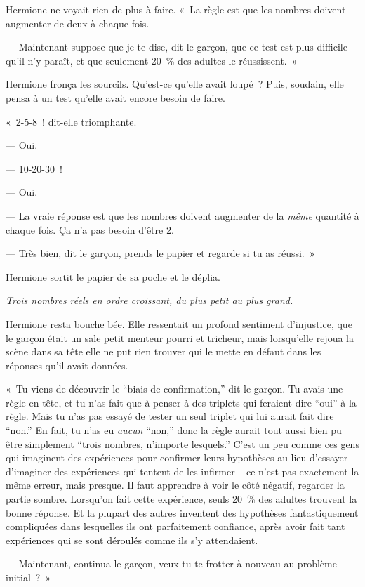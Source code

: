 Hermione ne voyait rien de plus à faire.
«~La règle est que les nombres doivent augmenter de deux à chaque fois.

--- Maintenant suppose que je te dise, dit le garçon, que ce test est plus difficile qu'il n'y paraît, et que seulement 20~\% des adultes le réussissent.~»

Hermione fronça les sourcils. Qu'est-ce qu'elle avait loupé~?
Puis, soudain, elle pensa à un test qu'elle avait encore besoin de faire.

«~2-5-8~! dit-elle triomphante.

--- Oui.

--- 10-20-30~!

--- Oui.

--- La vraie réponse est que les nombres doivent augmenter de la \emph{même} quantité à chaque fois. Ça n'a pas besoin d'être 2.

--- Très bien, dit le garçon, prends le papier et regarde si tu as réussi.~»

Hermione sortit le papier de sa poche et le déplia.

\emph{Trois nombres réels en ordre croissant, du plus petit au plus grand.}

Hermione resta bouche bée.
Elle ressentait un profond sentiment d'injustice, que le garçon était un sale petit menteur pourri et tricheur, mais lorsqu'elle rejoua la scène dans sa tête elle ne put rien trouver qui le mette en défaut dans les réponses qu'il avait données.

«~Tu viens de découvrir le “biais de confirmation,” dit le garçon.
Tu avais une règle en tête, et tu n'as fait que à penser à des triplets qui feraient dire “oui” à la règle.
Mais tu n'as pas essayé de tester un seul triplet qui lui aurait fait dire “non.”
En fait, tu n'as eu \emph{aucun} “non,” donc la règle aurait tout aussi bien pu être simplement “trois nombres, n'importe lesquels.”
C'est un peu comme ces gens qui imaginent des expériences pour confirmer leurs hypothèses au lieu d'essayer d'imaginer des expériences qui tentent de les infirmer -- ce n'est pas exactement la même erreur, mais presque.
Il faut apprendre à voir le côté négatif, regarder la partie sombre.
Lorsqu'on fait cette expérience, seuls 20~\% des adultes trouvent la bonne réponse.
Et la plupart des autres inventent des hypothèses fantastiquement compliquées dans lesquelles ils ont parfaitement confiance, après avoir fait tant expériences qui se sont déroulés comme ils s'y attendaient.

--- Maintenant, continua le garçon, veux-tu te frotter à nouveau au problème initial~?~»

